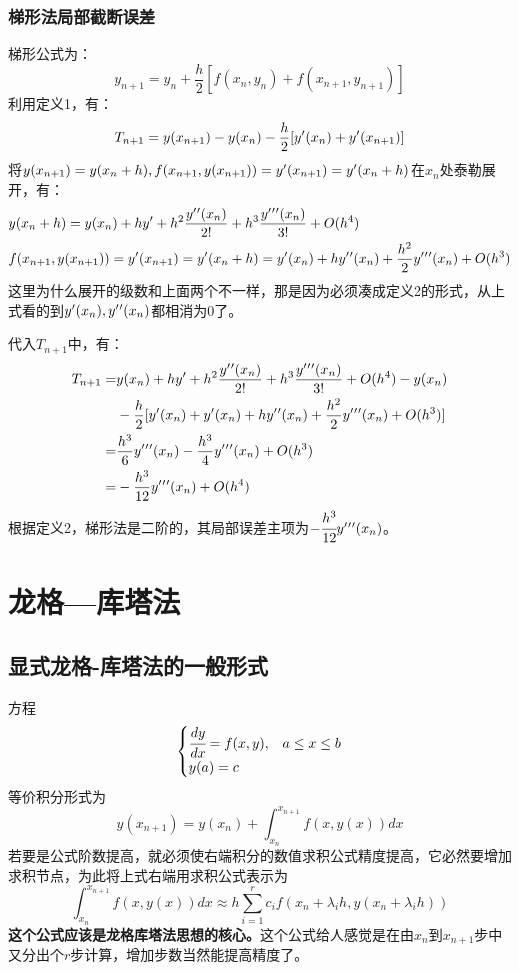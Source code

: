 \subsubsection{梯形法局部截断误差}
梯形公式为：
$$y_{n+1}=y_n+\frac{h}{2}[f(x_n,y_n)+f(x_{n+1},y_{n+1})]$$
利用定义1，有：
$$T_{n+1}=y(x_{n+1})-y(x_n)-\frac{h}{2}[y\rq{}(x_n)+y\rq{}(x_{n+1})]$$
将$y(x_{n+1})=y(x_n+h),f(x_{n+1},y(x_{n+1}))=y\rq{}(x_{n+1})=y\rq{}(x_n+h)$在$x_n$处泰勒展开，有：
\begin{align*}
&y(x_n+h)=y(x_n)+hy\rq{}+h^2\frac{y\rq{}\rq{}(x_n)}{2!}+h^3\frac{y\rq{}\rq{}\rq{}(x_n)}{3!}+O(h^4)\\
&f(x_{n+1},y(x_{n+1}))=y\rq{}(x_{n+1})=y\rq{}(x_n+h)
=y\rq{}(x_n)+hy\rq{}\rq{}(x_n)+\frac{h^2}{2}y\rq{}\rq{}\rq{}(x_n)+O(h^3)
\end{align*}
这里为什么展开的级数和上面两个不一样，那是因为必须凑成定义2的形式，从上式看的到$y\rq{}(x_n),y\rq{}\rq{}(x_n)$都相消为0了。

代入$T_{n+1}$中，有：
\begin{align*}
T_{n+1}=&y(x_n)+hy\rq{}+h^2\frac{y\rq{}\rq{}(x_n)}{2!}+h^3\frac{y\rq{}\rq{}\rq{}(x_n)}{3!}+O(h^4)-y(x_n)\\
& -\frac{h}{2}[y\rq{}(x_n)+y\rq{}(x_n)+hy\rq{}\rq{}(x_n)+\frac{h^2}{2}y\rq{}\rq{}\rq{}(x_n)+O(h^3)]\\
=&\frac{h^3}{6}y\rq{}\rq{}\rq{}(x_n)-\frac{h^3}{4}y\rq{}\rq{}\rq{}(x_n)+O(h^3)\\
=&-\frac {h^3}{12}y\rq{}\rq{}\rq{}(x_n)+O(h^4)
\end{align*}
根据定义2，梯形法是二阶的，其局部误差主项为$-\cfrac {h^3}{12}y\rq{}\rq{}\rq{}(x_n)$。



\section{龙格—库塔法}
\subsection{显式龙格-库塔法的一般形式}
方程
$$\begin{cases}\cfrac{dy}{dx}=f(x,y),&a\le x\le b\\ y(a)=c &\end{cases}$$
等价积分形式为
$$y(x_{n+1})=y(x_n)+\int_{x_n}^{x_{n+1}}f(x,y(x))dx$$
若要是公式阶数提高，就必须使右端积分的数值求积公式精度提高，它必然要增加求积节点，为此将上式右端用求积公式表示为
$$\int_{x_n}^{x_{n+1}}f(x,y(x))dx\approx h\sum_{i=1}^r c_i f(x_n+\lambda_i h,y(x_n+\lambda_i h))$$
\textbf{这个公式应该是龙格库塔法思想的核心。}这个公式给人感觉是在由$x_n$到$x_{n+1}$步中又分出个$r$步计算，增加步数当然能提高精度了。


